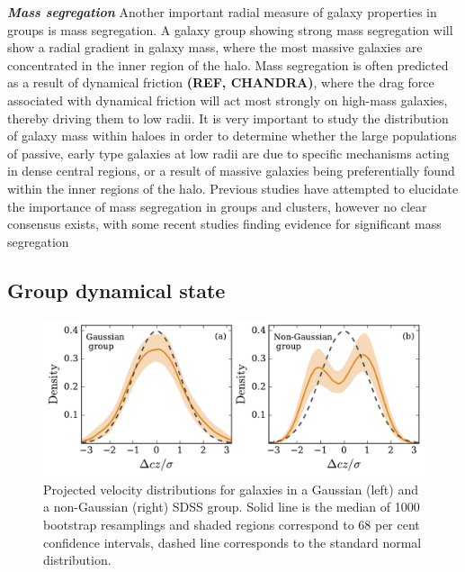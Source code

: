\noindent \textit{\textbf{Mass segregation}}
\smallskip
\newline
Another important radial measure of galaxy properties in groups is
mass segregation.  A galaxy group showing strong mass segregation will
show a radial gradient in galaxy mass, where the most massive galaxies
are concentrated in the inner region of the halo.  Mass segregation is
often predicted as a result of dynamical friction \textbf{(REF,
  CHANDRA)}, where the drag force associated with dynamical friction
will act most strongly on high-mass galaxies, thereby driving them to
low radii.  It is very important to study the distribution of galaxy
mass within haloes in order to determine whether the large populations
of passive, early type galaxies at low radii are due to specific
mechanisms acting in dense central regions, or a result of massive
galaxies being preferentially found within the inner regions of the
halo.  Previous studies have attempted to elucidate the importance of
mass segregation in groups and clusters, however no clear consensus
exists, with some recent studies finding evidence for significant mass
segregation \citep{vandenbosch2008a, presotto2012, balogh2014}  

\subsection{Group dynamical state}
\label{sec:dyn_state}

\begin{figure}[!ht]
  \centering
  \includegraphics[width=\textwidth]{vdist.pdf}
  \caption[Projected velocity distributions for galaxies in Gaussian
    and non-Gaussian SDSS groups]{Projected velocity distributions for galaxies in a
    Gaussian (left) and a non-Gaussian (right) SDSS group.  Solid line
    is the median of 1000
  bootstrap resamplings and shaded regions correspond to 68 per cent
  confidence intervals, dashed line corresponds to the standard normal
  distribution.}
  \label{fig:vdist}
\end{figure}

